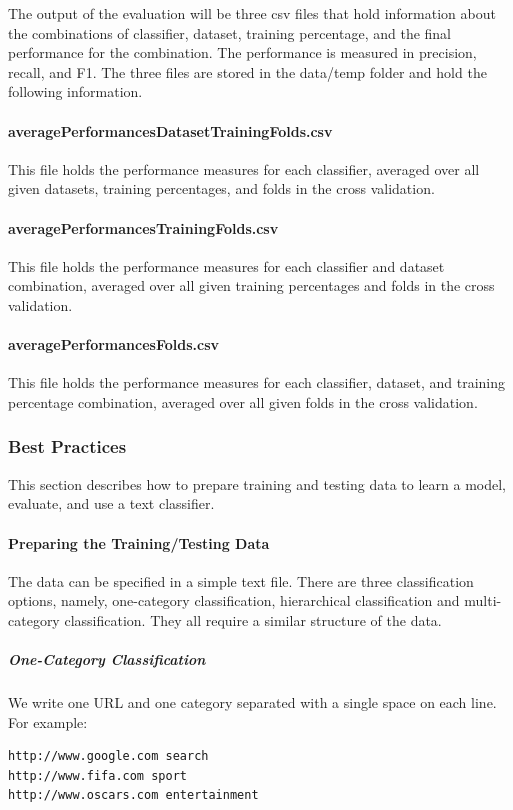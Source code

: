 The output of the evaluation will be three csv files that hold information about the combinations of classifier, dataset, training percentage, and the final performance for the combination. The performance is measured in precision, recall, and F1. The three files are stored in the data/temp folder and hold the following information.

\paragraph{averagePerformancesDatasetTrainingFolds.csv} This file holds the performance measures for each classifier, averaged over all given datasets, training percentages, and folds in the cross validation.

\paragraph{averagePerformancesTrainingFolds.csv} This file holds the performance measures for each classifier and dataset combination, averaged over all given training percentages and folds in the cross validation.

\paragraph{averagePerformancesFolds.csv} This file holds the performance measures for each classifier, dataset, and training percentage combination, averaged over all given folds in the cross validation.

\subsubsection{Best Practices}
\label{sec:bpTextClassification}
This section describes how to prepare training and testing data to learn a model, evaluate, and use a text classifier.

\paragraph{Preparing the Training/Testing Data}
The data can be specified in a simple text file. There are three classification options, namely, one-category classification, hierarchical classification and multi-category classification. They all require a similar structure of the data.

\subparagraph{One-Category Classification}
We write one URL and one category separated with a single space on each line. For example:
\begin{verbatim}
http://www.google.com search
http://www.fifa.com sport
http://www.oscars.com entertainment
\end{verbatim}

